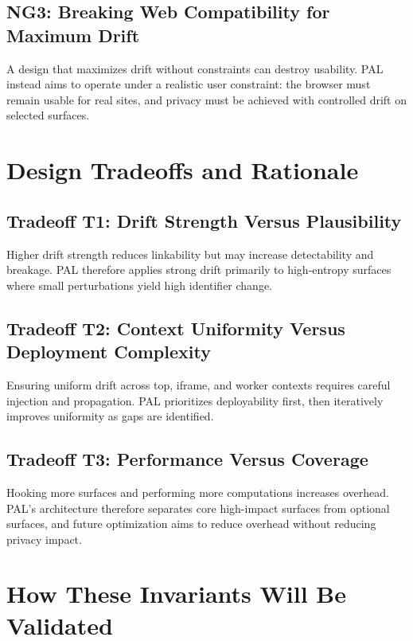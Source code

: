 \documentclass[11pt]{report}
\begin{document}
\subsection{NG3: Breaking Web Compatibility for Maximum Drift}

A design that maximizes drift without constraints can destroy usability. PAL instead aims to operate under a realistic user constraint: the browser must remain usable for real sites, and privacy must be achieved with controlled drift on selected surfaces.

\section{Design Tradeoffs and Rationale}

\subsection{Tradeoff T1: Drift Strength Versus Plausibility}

Higher drift strength reduces linkability but may increase detectability and breakage. PAL therefore applies strong drift primarily to high-entropy surfaces where small perturbations yield high identifier change.

\subsection{Tradeoff T2: Context Uniformity Versus Deployment Complexity}

Ensuring uniform drift across top, iframe, and worker contexts requires careful injection and propagation. PAL prioritizes deployability first, then iteratively improves uniformity as gaps are identified.

\subsection{Tradeoff T3: Performance Versus Coverage}

Hooking more surfaces and performing more computations increases overhead. PAL’s architecture therefore separates core high-impact surfaces from optional surfaces, and future optimization aims to reduce overhead without reducing privacy impact.

\section{How These Invariants Will Be Validated}
\end{document}
